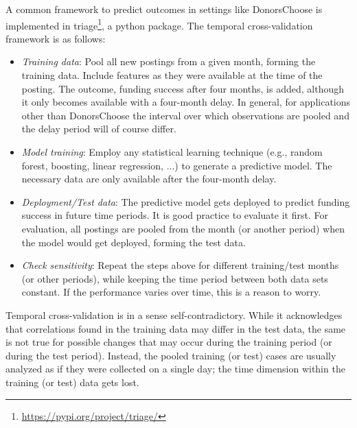 \documentclass{article}
\begin{document}
A common framework to predict outcomes in settings like DonorsChoose is implemented in triage\footnote{\url{https://pypi.org/project/triage/}}, a python package. The temporal cross-validation framework is as follows: 
\begin{itemize}
    \item \textit{Training data}: Pool all new postings from a given month, forming the training data. Include features as they were available at the time of the posting. The outcome, funding success after four months, is added, although it only becomes available with a four-month delay. In general, for applications other than DonorsChoose the interval over which observations are pooled and the delay period will of course differ.
    \item \textit{Model training}: Employ any statistical learning technique (e.g., random forest, boosting, linear regression, ...) to generate a predictive model. The necessary data are only available after the four-month delay.
    \item \textit{Deployment/Test data}: The predictive model gets deployed to predict funding success in future time periods. It is good practice to evaluate it first. For evaluation, all postings are pooled from the month (or another period) when the model would get deployed, forming the test data.
    \item \textit{Check sensitivity}: Repeat the steps above for different training/test months (or other periods), while keeping the time period between both data sets constant. If the performance varies over time, this is a reason to worry.
\end{itemize}

Temporal cross-validation is in a sense self-contradictory. While it acknowledges that correlations found in the training data may differ in the test data, the same is not true for possible changes that may occur during the training period (or during the test period). Instead, the pooled training (or test) cases are usually analyzed as if they were collected on a single day; the time dimension within the training (or test) data gets lost.
\end{document}
